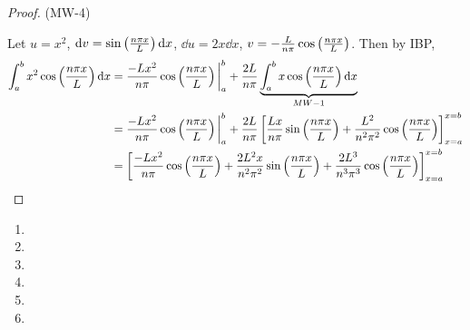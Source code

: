 \documentclass[12pt]{article}
\newcommand{\npxl}{\frac{n \pi x}{L}}
\newcommand{\onp}[1]{\frac{#1}{n \pi}}
\newcommand{\onps}[1]{\frac{#1}{n^2 \pi^2}}
\newcommand{\onpc}[1]{\frac{#1}{n^3 \pi^3}}
\newcommand{\cosp}[1]{\cos \pars{#1}}
\newcommand{\sinp}[1]{\sin \pars{#1}}
\newcommand{\nl}{\vspace{0.1in}\noindent}
\begin{document}
\begin{proof} (MW-4)
    
    \nl Let $u=x^2$, $\dd v = \sinp{\npxl} \dd x$, $\dd u = 2x \dd x$, $v = -\onp{L} \cosp{\npxl}$. Then by IBP, 
    \begin{align*}
        \int_a^b x^2 \cosp{\npxl} \dd x
        &= \onp{-Lx^2} \cosp{\npxl} \bigg|_a^b + \onp{2L} \underbrace{\int_{a}^b x \cosp{\npxl} \dd x}_{MW-1}\\
        &= \onp{-Lx^2} \cosp{\npxl} \bigg|_a^b + \onp{2L} \brac{ \frac{Lx}{n \pi} \sinp{\npxl} + \frac{L^2}{n^2 \pi^2} \cosp{\npxl}}_{x=a}^{x=b}\\
        &= \brac{
            \onp{-Lx^2} \cosp{\npxl} 
            + \onps{2L^2x} \sinp{\npxl} + \onpc{2L^3} \cosp{\npxl}
        }_{x=a}^{x=b}
    \end{align*}
\end{proof}

\begin{enumerate}
\item 
\item 
\item 
\item \newpage
\item \newpage
\item 
\end{enumerate}
\end{document}
